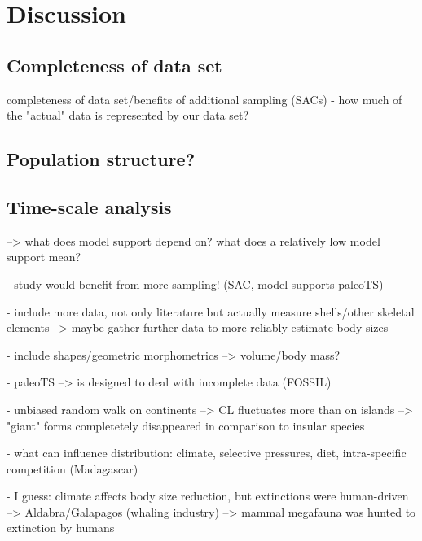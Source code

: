 \section{Discussion}

\subsection{Completeness of data set}

completeness of data set/benefits of additional sampling (SACs)
- how much of the "actual" data is represented by our data set?




\subsection{Population structure?}


\subsection{Time-scale analysis}

--> what does model support depend on? what does a relatively low model support mean?




- study would benefit from more sampling! (SAC, model supports paleoTS)

- include more data, not only literature but actually measure shells/other skeletal elements --> maybe gather further data to more reliably estimate body sizes

- include shapes/geometric morphometrics --> volume/body mass?

- paleoTS --> is designed to deal with incomplete data (FOSSIL)

- unbiased random walk on continents --> CL fluctuates more than on islands --> "giant" forms completetely disappeared in comparison to insular species

- what can influence distribution: climate, selective pressures, diet, intra-specific competition (Madagascar)

- I guess: climate affects body size reduction, but extinctions were human-driven
--> Aldabra/Galapagos (whaling industry)
--> mammal megafauna was hunted to extinction by humans




